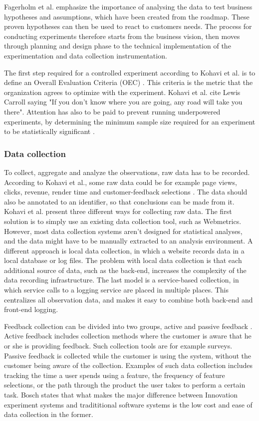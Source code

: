 \documentclass[english]{tktltiki2}
\theoremstyle{definition}
\theoremstyle{remark}
\begin{document}
Fagerholm et al. emphasize the importance of analysing the data to test business hypotheses and assumptions, which have been created from the roadmap. These proven hypotheses can then be used to react to customers needs. The process for conducting experiments therefore starts from the business vision, then moves through planning and design phase to the technical implementation of the experimentation and data collection instrumentation.  

The first step required for a controlled experiment according to Kohavi et al. is to define an Overall Evaluation Criteria (OEC) \cite{kohavi2009online}. This criteria is the metric that the organization agrees to optimize with the experiment. Kohavi et al. cite Lewis Carroll saying "If you don’t know where you are going, any road will take you there". Attention has also to be paid to prevent running underpowered experiments, by determining the minimum sample size required for an experiment to be statistically significant \cite{kohavi2009controlled}.

\subsubsection{Data collection} 
To collect, aggregate and analyze the observations, raw data has to be recorded. According to Kohavi et al., some raw data could be for example page views, clicks, revenue, render time and customer-feedback selections \cite{kohavi2007practical}. The data should also be annotated to an identifier, so that conclusions can be made from it. Kohavi et al. present three different ways for collecting raw data. The first solution is to simply use an existing data collection tool, such as Webmetrics. However, most data collection systems aren't designed for statistical analyses, and the data might have to be manually extracted to an analysis environment. A different approach is local data collection, in which a website records data in a local database or log files. The problem with local data collection is that each additional source of data, such as the back-end, increases the complexity of the data recording infrastructure. The last model is a service-based collection, in which service calls to a logging service are placed in multiple places. This centralizes all observation data, and makes it easy to combine both back-end and front-end logging.

Feedback collection can be divided into two groups, active and passive feedback \cite{bosch2012building}. Active feedback includes collection methods where the customer is aware that he or she is providing feedback. Such collection tools are for example surveys. Passive feedback is collected while the customer is using the system, without the customer being aware of the collection. Examples of such data collection includes tracking the time a user spends using a feature, the frequency of feature selections, or the path through the product the user takes to perform a certain task. Bosch states that what makes the major difference between Innovation experiment systems and tradititional software systems is the low cost and ease of data collection in the former. 
\end{document}
